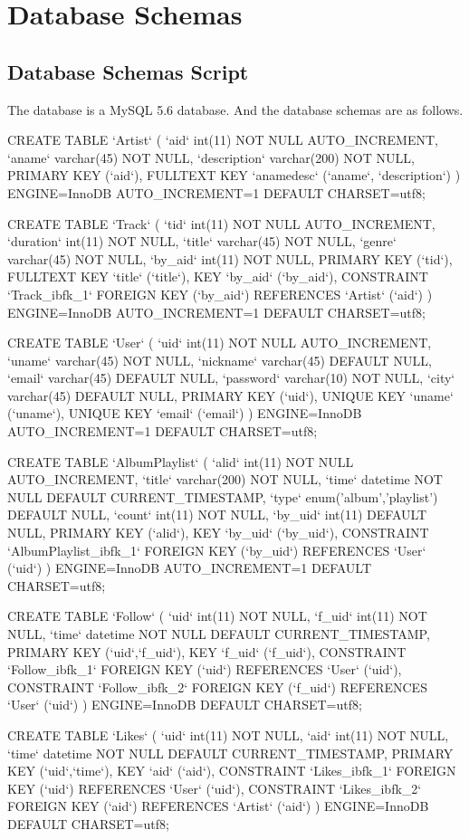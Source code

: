 \documentclass[letterpaper, 12pt]{report}
\begin{document}
	\section{Database Schemas}
	\subsection{Database Schemas Script}
	The database is a MySQL 5.6 database. And the database schemas are as follows.
	\begin{spverbatim}
	CREATE TABLE `Artist` (
	`aid` int(11) NOT NULL AUTO_INCREMENT,
	`aname` varchar(45) NOT NULL,
	`description` varchar(200) NOT NULL,
	PRIMARY KEY (`aid`),
	FULLTEXT KEY `anamedesc` (`aname`, `description`)
	) ENGINE=InnoDB AUTO_INCREMENT=1 DEFAULT CHARSET=utf8;
	
	CREATE TABLE `Track` (
	`tid` int(11) NOT NULL AUTO_INCREMENT,
	`duration` int(11) NOT NULL,
	`title` varchar(45) NOT NULL,
	`genre` varchar(45) NOT NULL,
	`by_aid` int(11) NOT NULL,
	PRIMARY KEY (`tid`),
	FULLTEXT KEY `title` (`title`),
	KEY `by_aid` (`by_aid`),
	CONSTRAINT `Track_ibfk_1` FOREIGN KEY (`by_aid`) REFERENCES `Artist` (`aid`)
	) ENGINE=InnoDB AUTO_INCREMENT=1 DEFAULT CHARSET=utf8;
	
	CREATE TABLE `User` (
	`uid` int(11) NOT NULL AUTO_INCREMENT,
	`uname` varchar(45) NOT NULL,
	`nickname` varchar(45) DEFAULT NULL,
	`email` varchar(45) DEFAULT NULL,
	`password` varchar(10) NOT NULL,
	`city` varchar(45) DEFAULT NULL,
	PRIMARY KEY (`uid`),
	UNIQUE KEY `uname` (`uname`),
	UNIQUE KEY `email` (`email`)
	) ENGINE=InnoDB AUTO_INCREMENT=1 DEFAULT CHARSET=utf8;
	
	CREATE TABLE `AlbumPlaylist` (
	`alid` int(11) NOT NULL AUTO_INCREMENT,
	`title` varchar(200) NOT NULL,
	`time` datetime NOT NULL DEFAULT CURRENT_TIMESTAMP,
	`type` enum('album','playlist') DEFAULT NULL,
	`count` int(11) NOT NULL,
	`by_uid` int(11) DEFAULT NULL,
	PRIMARY KEY (`alid`),
	KEY `by_uid` (`by_uid`),
	CONSTRAINT `AlbumPlaylist_ibfk_1` FOREIGN KEY (`by_uid`) REFERENCES `User` (`uid`)
	) ENGINE=InnoDB AUTO_INCREMENT=1 DEFAULT CHARSET=utf8;
	
	CREATE TABLE `Follow` (
	`uid` int(11) NOT NULL,
	`f_uid` int(11) NOT NULL,
	`time` datetime NOT NULL DEFAULT CURRENT_TIMESTAMP,
	PRIMARY KEY (`uid`,`f_uid`),
	KEY `f_uid` (`f_uid`),
	CONSTRAINT `Follow_ibfk_1` FOREIGN KEY (`uid`) REFERENCES `User` (`uid`),
	CONSTRAINT `Follow_ibfk_2` FOREIGN KEY (`f_uid`) REFERENCES `User` (`uid`)
	) ENGINE=InnoDB DEFAULT CHARSET=utf8;
	
	CREATE TABLE `Likes` (
	`uid` int(11) NOT NULL,
	`aid` int(11) NOT NULL,
	`time` datetime NOT NULL DEFAULT CURRENT_TIMESTAMP,
	PRIMARY KEY (`uid`,`time`),
	KEY `aid` (`aid`),
	CONSTRAINT `Likes_ibfk_1` FOREIGN KEY (`uid`) REFERENCES `User` (`uid`),
	CONSTRAINT `Likes_ibfk_2` FOREIGN KEY (`aid`) REFERENCES `Artist` (`aid`)
	) ENGINE=InnoDB DEFAULT CHARSET=utf8;
	

\end{spverbatim}
\end{document}
